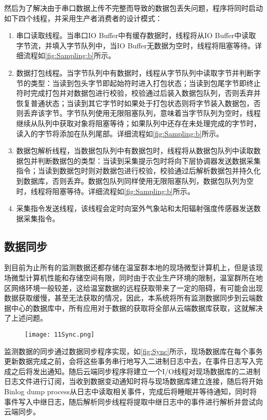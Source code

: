 然后为了解决由于串口数据上传不完整而导致的数据包丢失问题，程序将同时启动如下四个线程，并采用生产者消费者的设计模式：
	\begin{enumerate}
		\item 串口读取线程。当串口IO Buffer中有缓存数据时，线程将从IO Buffer中读取字节流，并填入字节队列中，当IO Buffer无数据为空时，线程将阻塞等待。详细流程如\ref{fig:Sampling:b}所示。
		\item 数据打包线程。当字节队列中有数据时，线程从字节队列中读取字节并判断字节的类型：当读到包头字节即起始符时进入打包状态；当读到包尾字节即终止符时完成打包并对数据包进行校验，校验通过后装入数据包队列，否则丢弃并恢复普通状态；当读到其它字节时如果处于打包状态则将字节装入数据包，否则丢弃该字节。字节队列使用无限阻塞队列，意味着当字节队列为空时，线程继续从队列中获取对象将阻塞等待；如果队列中还存在未处理完成的字节时，读入的字节将添加在队列尾部。详细流程如\ref{fig:Sampling:b}所示。
		\item 数据包解析线程，当数据包队列中有数据包时，线程将从数据包队列中读取数据包并判断数据包的类型：当读到采集提示包时将向下层协调器发送数据采集指令；当读到数据包时则对数据包进行校验，校验通过后解析数据包并持久化到数据库，否则丢弃。数据包队列同样使用无限阻塞队列，数据包队列为空时，线程将阻塞等待。详细流程如\ref{fig:Sampling:b}所示。
		\item 采集指令发送线程，该线程会定时向室外气象站和太阳辐射强度传感器发送数据采集指令。
	\end{enumerate}
	
	\subsection{数据同步}
到目前为止所有的监测数据还都存储在温室群本地的现场微型计算机上，但是该现场微型计算机性能和存储空间有限，同时由于农业生产环境的限制，温室群所在地区网络环境一般较差，这给温室数据的远程获取带来了一定的阻碍，有可能会出现数据获取缓慢，甚至无法获取的情况，因此，本系统将所有监测数据同步到云端数据中心的数据库中，所有应用对于数据的获取将全部从云端数据库获取，这就解决了上述问题。
	  	\begin{figure}[!htp]
  			\centering
 			\texttt{[image: 11Sync.png]}
		\end{figure}
监测数据的同步通过数据同步程序实现，如\ref{fig:Sync}所示，现场数据库在每个事务更新数据完成之前，会将这些事务串行地写入二进制日志中去，在事件日志写入完成之后将发出通知。随后云端同步程序将建立一个I/O线程对现场数据库的二进制日志文件进行订阅，当收到数据变动通知时将与现场数据库建立连接，随后将开始Binlog dump process从日志中读取相关事件，完成后将睡眠并等待通知，同时将事件写入中继日志，随后解析同步线程将提取中继日志中的事件进行解析并尝试向云端同步。

